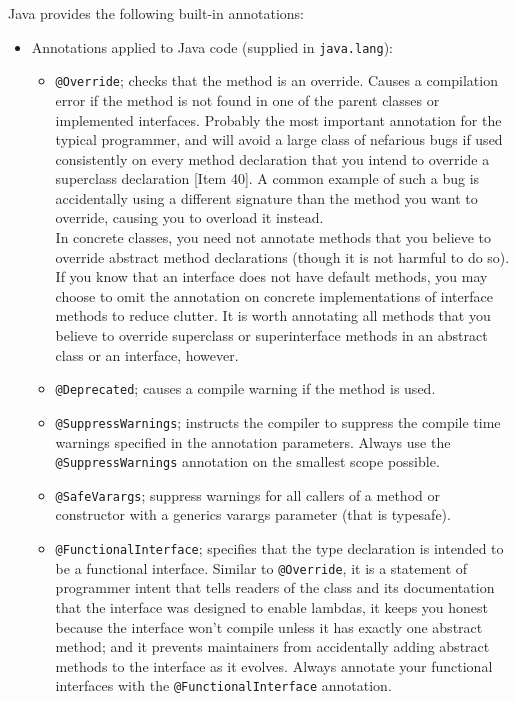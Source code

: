 \documentclass[table, xcdraw]{article}%
\begin{document}
Java provides the following built-in annotations:

\begin{itemize}
    \item Annotations applied to Java code (supplied in \texttt{java.lang}):
    \begin{itemize}
        \item \texttt{@Override}; checks that the method is an override. Causes a compilation error if the method is not found in one of the parent classes or implemented interfaces. Probably the most important annotation for the typical programmer, and will avoid a large class of nefarious bugs if used consistently on every method declaration that you intend to override a superclass declaration [Item 40]. A common example of such a bug is accidentally using a different signature than the method you want to override, causing you to overload it instead.\\
        In concrete classes, you need not annotate methods that you believe to override abstract method declarations (though it is not harmful to do so). If you know that an interface does not have default methods, you may choose to omit the annotation on concrete implementations of interface methods to reduce clutter. It is worth annotating all methods that you believe to override superclass or superinterface methods in an abstract class or an interface, however.
        \item \texttt{@Deprecated}; causes a compile warning if the method is used.
        \item \texttt{@SuppressWarnings}; instructs the compiler to suppress the compile time warnings specified in the annotation parameters. Always use the \texttt{@SuppressWarnings} annotation on the smallest scope possible.
        \item \texttt{@SafeVarargs}; suppress warnings for all callers of a method or constructor with a generics varargs parameter (that is typesafe).
        \item \texttt{@FunctionalInterface}; specifies that the type declaration is intended to be a functional interface. Similar to \texttt{@Override}, it is a statement of programmer intent that tells readers of the class and its documentation that the interface was designed to enable lambdas, it keeps you honest because the interface won't compile unless it has exactly one abstract method; and it prevents maintainers from accidentally adding abstract methods to the interface as it evolves. Always annotate your functional interfaces with the \texttt{@FunctionalInterface} annotation.
    \end{itemize}


\end{itemize}
\end{document}
